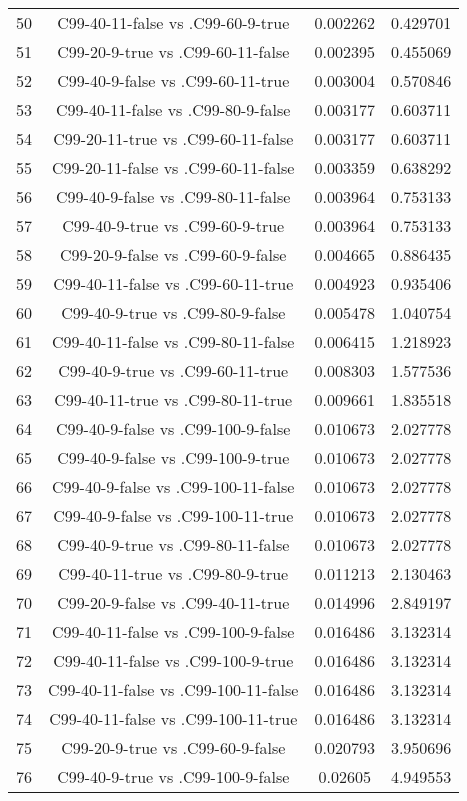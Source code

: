 \documentclass[a4paper,10pt]{article}
\begin{document}
\begin{landscape}
\begin{table}[!htp]
\begin{tabular}{cccc}
50&C99-40-11-false vs .C99-60-9-true&0.002262&0.429701\\
51&C99-20-9-true vs .C99-60-11-false&0.002395&0.455069\\
52&C99-40-9-false vs .C99-60-11-true&0.003004&0.570846\\
53&C99-40-11-false vs .C99-80-9-false&0.003177&0.603711\\
54&C99-20-11-true vs .C99-60-11-false&0.003177&0.603711\\
55&C99-20-11-false vs .C99-60-11-false&0.003359&0.638292\\
56&C99-40-9-false vs .C99-80-11-false&0.003964&0.753133\\
57&C99-40-9-true vs .C99-60-9-true&0.003964&0.753133\\
58&C99-20-9-false vs .C99-60-9-false&0.004665&0.886435\\
59&C99-40-11-false vs .C99-60-11-true&0.004923&0.935406\\
60&C99-40-9-true vs .C99-80-9-false&0.005478&1.040754\\
61&C99-40-11-false vs .C99-80-11-false&0.006415&1.218923\\
62&C99-40-9-true vs .C99-60-11-true&0.008303&1.577536\\
63&C99-40-11-true vs .C99-80-11-true&0.009661&1.835518\\
64&C99-40-9-false vs .C99-100-9-false&0.010673&2.027778\\
65&C99-40-9-false vs .C99-100-9-true&0.010673&2.027778\\
66&C99-40-9-false vs .C99-100-11-false&0.010673&2.027778\\
67&C99-40-9-false vs .C99-100-11-true&0.010673&2.027778\\
68&C99-40-9-true vs .C99-80-11-false&0.010673&2.027778\\
69&C99-40-11-true vs .C99-80-9-true&0.011213&2.130463\\
70&C99-20-9-false vs .C99-40-11-true&0.014996&2.849197\\
71&C99-40-11-false vs .C99-100-9-false&0.016486&3.132314\\
72&C99-40-11-false vs .C99-100-9-true&0.016486&3.132314\\
73&C99-40-11-false vs .C99-100-11-false&0.016486&3.132314\\
74&C99-40-11-false vs .C99-100-11-true&0.016486&3.132314\\
75&C99-20-9-true vs .C99-60-9-false&0.020793&3.950696\\
76&C99-40-9-true vs .C99-100-9-false&0.02605&4.949553\\

\end{tabular}
\end{table}
\end{landscape}
\end{document}
